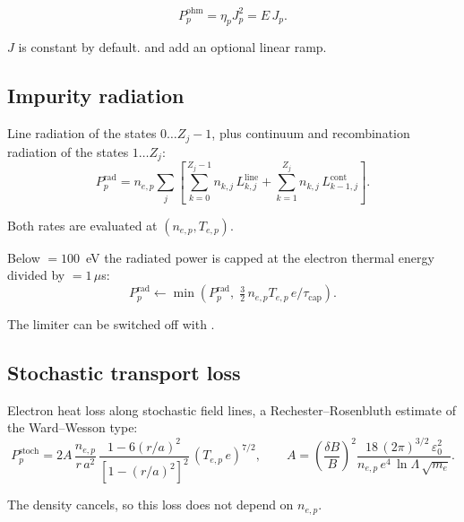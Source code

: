 \documentclass[11pt,a4paper]{article}
\begin{document}
\begin{equation}
  P^{\mathrm{ohm}}_p = \eta_p J_p^2 = E\, J_p .
\end{equation}

$J$ is constant by default.  and  add an
optional linear ramp.

\subsection*{Impurity radiation}

Line radiation of the states $0 \dots Z_j - 1$, plus continuum and recombination radiation of
the states $1 \dots Z_j$:
\begin{equation}
  P^{\mathrm{rad}}_p = n_{e,p} \sum_j \left[
      \sum_{k=0}^{Z_j-1} n_{k,j}\, L^{\mathrm{line}}_{k,j}
    + \sum_{k=1}^{Z_j}   n_{k,j}\, L^{\mathrm{cont}}_{k-1,j} \right] .
\end{equation}

Both rates are evaluated at $(n_{e,p}, T_{e,p})$.

Below  $= 100$~eV the radiated power is capped at the
electron thermal energy divided by  $= 1\,\mu$s:
\begin{equation}
  P^{\mathrm{rad}}_p \leftarrow \min\!\left( P^{\mathrm{rad}}_p ,\;
    \tfrac{3}{2}\, n_{e,p} T_{e,p}\, e / \tau_{\mathrm{cap}} \right) .
\end{equation}

The limiter can be switched off with .

\subsection*{Stochastic transport loss}

Electron heat loss along stochastic field lines, a Rechester--Rosenbluth estimate of the
Ward--Wesson type:
\begin{equation}
  P^{\mathrm{stoch}}_p = 2 A\, \frac{n_{e,p}}{r\, a^2}\,
    \frac{1 - 6 (r/a)^2}{\left[1 - (r/a)^2\right]^2}\, \left(T_{e,p}\, e\right)^{7/2} ,
  \qquad
  A = \left(\frac{\delta B}{B}\right)^{2}
      \frac{18\, (2\pi)^{3/2}\, \varepsilon_0^2}{n_{e,p}\, e^4\, \ln\Lambda\, \sqrt{m_e}} .
\end{equation}

The density cancels, so this loss does not depend on $n_{e,p}$.
\end{document}
